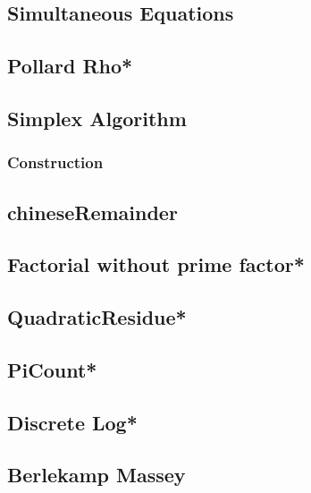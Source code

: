 \subsection{Simultaneous Equations}

\subsection{Pollard Rho*} %

\subsection{Simplex Algorithm}

\subsubsection{Construction}

%
\subsection{chineseRemainder}

\subsection{Factorial without prime factor*} %

\subsection{QuadraticResidue*} %

\subsection{PiCount*} %

\subsection{Discrete Log*} %

\subsection{Berlekamp Massey}

